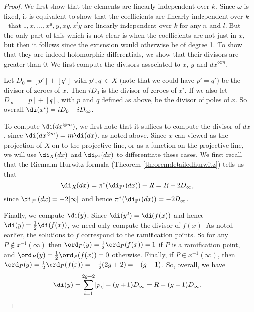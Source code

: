     \begin{proof}
    We first show that the elements are linearly independent over $k$.
    Since $\omega$ is fixed, it is equivalent to show that the coefficients are linearly independent over $k$ - \ie that $1,x,\ldots ,x^n, y, xy, x^ly$ are linearly independent over $k$ for any $n$ and $l$.
    But the only part of this which is not clear is when the coefficients are not just in $x$, but then it follows since the extension would otherwise be of degree 1.
    To show that they are indeed holomorphic differentials, we show that their divisors are greater than $0$.
    We first compute the divisors associated to $x$, $y$ and $dx^{\otimes m}$.
    
    Let $D_0 = [p']+[q']$ with $p',q' \in X$ (note that we could have $p' = q'$) be the divisor of zeroes of $x$. 
    Then $ i D_0$ is the divisor of zeroes of $x^i$. 
    If we also let $D_\infty = [p] + [q]$, with $p$ and $q$ defined as above, be the divisor of poles of $x$. 
    So overall $\di (x^i) = i D_0 - i D_\infty$.
    
    
    To compute $\di (dx^{\otimes m})$, we first note that it suffices to compute the divisor of $dx$, since $\di (dx^{\otimes m}) =m\di (dx)$, as noted above.
    Since $x$ can viewed as the projection of $X$ on to the projective line, or as a function on the projective line, we will use $\di_X (dx)$ and $\di_{\mathbb P^1} (dx)$ to differentiate these cases.
    We first recall that the Riemann-Hurwitz formula (Theorem \ref{theoremdetailedhurwitz}) tells us that
        \[
        \di_X (dx) = \pi^*( \di_{\mathbb P^1}(dx)) + R = R - 2D_{\infty},
        \]
    since $\di_{\mathbb P^1}(dx) = -2[\infty]$ and hence $\pi^* (\di_{\mathbb P^1}(dx)) = -2D_\infty$.
    
    Finally, we compute $\di (y)$.
    Since $\di (y^2) = \di (f(x))$ and hence $\di(y) = \frac{1}{2}\di(f(x))$, we need only compute the divisor of $f(x)$.
    As noted earlier, the solutions to $f$ correspond to the ramification points.
    So for any $P\notin x^{-1}(\infty)$ then $\ord_P(y) =  \frac{1}{2}\ord_P(f(x)) = 1$ if $P$ is a ramification point, and $\ord_P(y) = \frac{1}{2}\ord_P(f(x)) = 0$ otherwise.
    Finally, if $P\in x^{-1}(\infty)$, then $\ord_P(y)  = \frac{1}{2}\ord_P(f(x)) = - \frac{1}{2} (2g+2) = -(g+1)$.
    So, overall, we have 
        \[
        \di(y) = \sum_{i=1}^{2g+2} [p_i]- (g+1)D_\infty = R - (g+1)D_{\infty}.
        \]
    

\end{proof}
